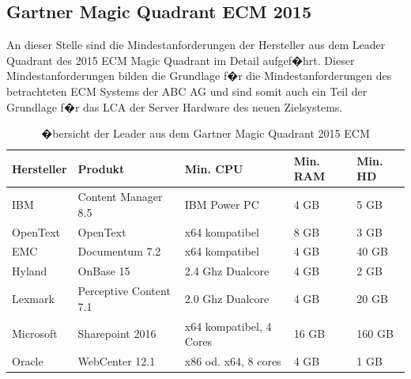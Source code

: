 \documentclass[a4paper,twoside,10pt]{report}
\begin{document}
\cleardoublepage
{}
{}
\listoftables


\cleardoublepage
\renewcommand{\appendixtocname}{Anh�nge}
\renewcommand{\appendixpagename}{Anh�nge}
\appendixpageon
\begin{appendices}
\cleardoublepage
\chapter{Gartner Magic Quadrant ECM 2015}\label{anh:magicq}
An dieser Stelle sind die Mindestanforderungen der Hersteller aus dem Leader Quadrant des 2015 ECM Magic Quadrant im Detail aufgef�hrt. Dieser Mindestanforderungen bilden die Grundlage f�r die Mindestanforderungen des betrachteten \ac{ECM} Systems der ABC AG und sind somit auch ein Teil der Grundlage f�r das \ac{LCA} der Server Hardware des neuen Zielsystems.
\begin{table} [htb]
	\begin{tabular}{l|llll}
	\hline
	\textbf{Hersteller} & \textbf{Produkt} & \textbf{Min. CPU} & \textbf{Min. RAM} & \textbf{Min. HD} \\
	\hline
	IBM 			& Content Manager 8.5 	& IBM Power PC 						& 4 GB	& 5 GB		\\
	OpenText 	&	OpenText							&	x64 kompatibel					& 8 GB	& 3 GB 		\\
	EMC				&	Documentum 7.2				&	x64 kompatibel					&	4 GB	& 40 GB		\\
	Hyland		&	OnBase 15							&	2.4 Ghz Dualcore				&	4 GB	&	2 GB		\\
	Lexmark		&	Perceptive Content 7.1& 2.0 Ghz Dualcore				&	4 GB	&	20 GB		\\
	Microsoft	&	Sharepoint 2016				&	x64 kompatibel, 4 Cores	& 16 GB	&	160 GB	\\
	Oracle		&	WebCenter 12.1				&	x86 od. x64, 8 cores		&	4 GB	&	1 GB		\\
	\hline
	\end{tabular}
\caption{�bersicht der Leader aus dem Gartner Magic Quadrant 2015 ECM} 
\label{tab:gartner}
\end{table}

\cleardoublepage

\end{appendices}
\end{document}
